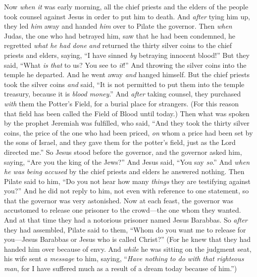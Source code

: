 \begin{biblechapter} %
 Now \textit{when it} was early morning, all the chief priests and the elders of the people took counsel against Jesus in order to put him to death.
\verse And \textit{after} tying him up, they led \textit{him} away and handed \textit{him} over to Pilate the governor.
 Then \textit{when} Judas, the one who had betrayed him, saw that he had been condemned, he regretted \textit{what he had done} \textit{and} returned the thirty silver coins to the chief priests and elders,
\verse saying, “I have sinned \textit{by} betraying innocent blood!” But they said, “What \textit{is that} to us? You see to \textit{it}!”
\verse And throwing the silver coins into the temple he departed. And he went away \textit{and} hanged himself.
\verse But the chief priests took the silver coins \textit{and} said, “It is not permitted to put them into the temple treasury, because it is \textit{blood money}.”
\verse And \textit{after} taking counsel, they purchased \textit{with} them the Potter’s Field, for a burial place for strangers.
\verse (For this reason that field has been called the Field of Blood until today.)
\verse Then what was spoken by the prophet Jeremiah was fulfilled, who said, “And they took the thirty silver coins, the price of the one who had been priced, \textit{on} whom a price had been set by the sons of Israel,
\verse and they gave them for the potter’s field, just as the Lord directed me.”
 So Jesus stood before the governor, and the governor asked him, saying, “Are you the king of the Jews?” And Jesus said, “You say \textit{so}.”
\verse And \textit{when he was being accused} by the chief priests and elders he answered nothing.
\verse Then Pilate said to him, “Do you not hear how many \textit{things} they are testifying against you?”
\verse And he did not reply to him, not even with reference to one statement, so that the governor was very astonished.
 Now at each feast, the governor was accustomed to release one prisoner to the crowd—the one whom they wanted.
\verse And at that time they had a notorious prisoner named Jesus Barabbas.
\verse So \textit{after} they had assembled, Pilate said to them, “Whom do you want me to release for you—Jesus Barabbas or Jesus who is called Christ?”
\verse (For he knew that they had handed him over because of envy.
\verse And \textit{while} he was sitting on the judgment seat, his wife sent \textit{a message} to him, saying, “\textit{Have nothing to do with that righteous man}, for I have suffered much as a result of a dream today because of him.”)

\end{biblechapter}
